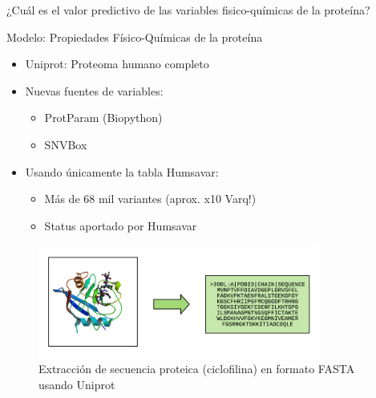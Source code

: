 \documentclass[
  spanish,
  ignorenonframetext,
]{beamer}
\providecommand{\tightlist}{%
  \setlength{\itemsep}{0pt}\setlength{\parskip}{0pt}}
\begin{document}
\begin{frame}{}
\protect\hypertarget{section-1}{}

\begin{center}
\Huge ¿Cuál es el valor predictivo de las variables fisico-químicas de la proteína?
\end{center}

\end{frame}

\begin{frame}{Modelo: Propiedades Físico-Químicas de la proteína}
\protect\hypertarget{modelo-propiedades-fuxedsico-quuxedmicas-de-la-proteuxedna}{}

\begin{itemize}
\tightlist
\item
  Uniprot: Proteoma humano completo
\item
  Nuevas fuentes de variables:

  \begin{itemize}
  \tightlist
  \item
    ProtParam (Biopython)
  \item
    SNVBox
  \end{itemize}
\item
  Usando únicamente la tabla Humsavar:

  \begin{itemize}
  \tightlist
  \item
    Más de 68 mil variantes (aprox. x10 Varq!)
  \item
    Status aportado por Humsavar
  \end{itemize}
\end{itemize}

\begin{figure}
\centering
\includegraphics[width=3.64583in,height=\textheight]{fasta.pdf}
\caption{Extracción de secuencia proteica (ciclofilina) en formato FASTA
usando Uniprot}
\end{figure}

\end{frame}
\end{document}
